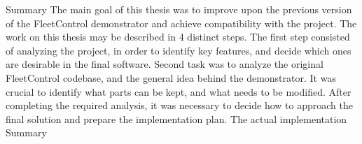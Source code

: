 \chap Summary
The main goal of this thesis was to improve upon the previous version of the FleetControl demonstrator and achieve compatibility with the {\mapfIR} project. 
The work on this thesis may be described in 4 distinct steps.\br
The first step consisted of analyzing the {\mapfIR} project, in order to identify key features, and decide which ones are desirable in the final software. 
\br
Second task was to analyze the original FleetControl codebase, and the general idea behind the demonstrator. It was crucial to identify what parts can be kept, and what needs to be modified.
\br
After completing the required analysis, it was necessary to decide how to approach the final solution and prepare the implementation plan.
\br
The actual implementation
\br
Summary
 